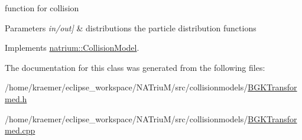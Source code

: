 function for collision 


\begin{DoxyParams}{\-Parameters}
{\em in/out\mbox{]}} & distributions the particle distribution functions \\
\hline
\end{DoxyParams}


\-Implements \hyperlink{classnatrium_1_1CollisionModel_aa4f3dd379940af2d80509dd6f5e23c62}{natrium\-::\-Collision\-Model}.



\-The documentation for this class was generated from the following files\-:\begin{DoxyCompactItemize}
\item 
/home/kraemer/eclipse\-\_\-workspace/\-N\-A\-Triu\-M/src/collisionmodels/\hyperlink{BGKTransformed_8h}{\-B\-G\-K\-Transformed.\-h}\item 
/home/kraemer/eclipse\-\_\-workspace/\-N\-A\-Triu\-M/src/collisionmodels/\hyperlink{BGKTransformed_8cpp}{\-B\-G\-K\-Transformed.\-cpp}\end{DoxyCompactItemize}
